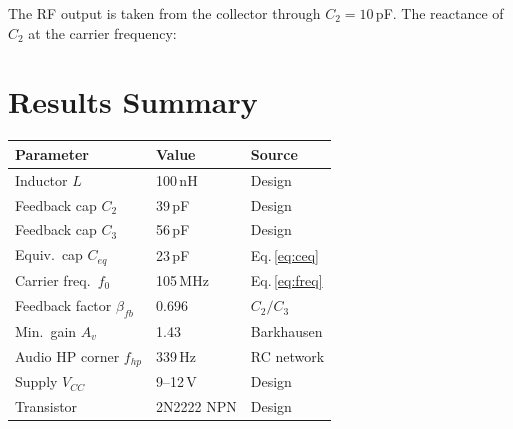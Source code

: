 \documentclass[10pt, twocolumn]{article}
\begin{document}
The RF output is taken from the collector through $C_2 = 10$\,pF. The
reactance of $C_2$ at the carrier frequency:


\section{Results Summary}

\begin{center}
\begin{tabular}{lll}
  \toprule
  Parameter & Value & Source \\
  \midrule
  Inductor $L$               & 100\,nH      & Design \\
  Feedback cap $C_2$         & 39\,pF       & Design \\
  Feedback cap $C_3$         & 56\,pF       & Design \\
  Equiv.\ cap $C_{eq}$       & 23\,pF     & Eq.\,\ref{eq:ceq} \\
  Carrier freq.\ $f_0$       & 105\,MHz   & Eq.\,\ref{eq:freq} \\
  Feedback factor $\beta_{fb}$& 0.696        & $C_2/C_3$ \\
  Min.\ gain $A_v$            & 1.43          & Barkhausen \\
  Audio HP corner $f_{hp}$   & 339\,Hz      & RC network \\
  Supply $V_{CC}$             & 9--12\,V     & Design \\
  Transistor                  & 2N2222 NPN   & Design \\
  \bottomrule
\end{tabular}
\end{center}
\end{document}

